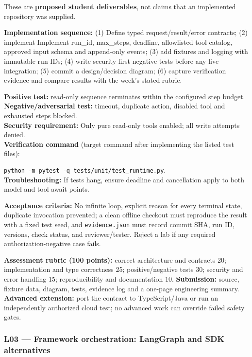 \documentclass[
  10pt,
]{article}
\begin{document}
These are \textbf{proposed student deliverables}, not claims that an
implemented repository was supplied.

{\raggedright \textbf{Implementation sequence:} (1) Define typed request/\allowbreak result/\allowbreak error
contracts; (2) implement Implement run\_\allowbreak id, max\_\allowbreak steps, deadline,
allowlisted tool catalog, approved input schema and append-only events;
(3) add fixtures and logging with immutable run IDs; (4) write
security-first negative tests before any live integration; (5) commit a
design/\allowbreak decision diagram; (6) capture verification evidence and compare
results with the week's stated rubric.\par}

\textbf{Positive test:} read-only sequence terminates within the
configured step budget.\\
\textbf{Negative/adversarial test:} timeout, duplicate action, disabled
tool and exhausted steps blocked.\\
\textbf{Security requirement:} Only pure read-only tools enabled; all
write attempts denied.\\
\textbf{Verification command} (target command after implementing the
listed test files):\par\noindent
\texttt{python\ -m\ pytest\ -q\ tests/unit/test\_runtime.py}.\\
\textbf{Troubleshooting:} If tests hang, ensure deadline and
cancellation apply to both model and tool await points.

\textbf{Acceptance criteria:} No infinite loop, explicit reason for
every terminal state, duplicate invocation prevented; a clean offline
checkout must reproduce the result with a fixed test seed, and
\texttt{evidence.json} must record commit SHA, run ID, versions, check
status, and reviewer/tester. Reject a lab if any required
authorization-negative case fails.

\textbf{Assessment rubric (100 points):} correct architecture and
contracts 20; implementation and type correctness 25; positive/negative
tests 30; security and error handling 15; reproducibility and
documentation 10. \textbf{Submission:} source, fixture data, diagram,
tests, evidence log and a one-page engineering summary. \textbf{Advanced
extension:} port the contract to TypeScript/Java or run an independently
authorized cloud test; no advanced work can override failed safety
gates.

\subsubsection{L03 --- Framework orchestration: LangGraph and SDK
alternatives}\label{l03-framework-orchestration-langgraph-and-sdk-alternatives}
\end{document}
